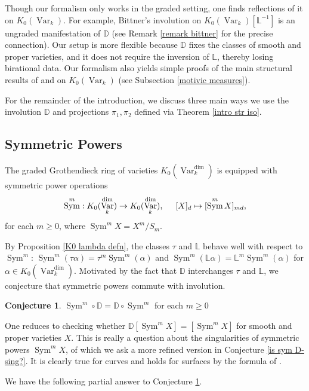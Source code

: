 \documentclass{amsart}
\theoremstyle{definition}
\newtheorem{conj}[thm]{Conjecture}
\DeclareMathOperator{\Sym}{Sym}
\DeclareMathOperator{\Var}{Var}
\newcommand{\Kdim}{K_0(\Var_k^{\dim})}
\numberwithin{equation}{section}
\begin{document}
Though our formalism only works in the graded setting, one finds reflections of it on $K_0(\Var_k)$. For example, Bittner's involution \cite{bittnerrelations} on $K_0(\Var_k)[\mathbb{L}^{-1}]$ is an ungraded manifestation of $\mathbb{D}$ (see Remark \ref{remark bittner} for the precise connection). Our setup is more flexible because $\mathbb{D}$ fixes the classes of smooth and proper varieties, and it does not require the inversion of $\mathbb{L}$, thereby losing birational data. Our formalism also yields simple proofs of the main structural results of \cite{larsenluntsstable} and \cite{zakharevich} on $K_0(\Var_k)$ (see Subsection \ref{motivic measures}).

For the remainder of the introduction, we discuss three main ways we use the involution $\mathbb{D}$ and projections $\pi_1, \pi_2$ defined via Theorem \ref{intro str iso}.


\subsection{Symmetric Powers}
The graded Grothendieck ring of varieties $\Kdim$ is equipped with symmetric power operations
\begin{align*}
    \Sym^m: \Kdim \rightarrow \Kdim, \hspace{.5cm} [X]_d \mapsto [\Sym^m X]_{md},
\end{align*}
for each $m \geq 0$, where $\Sym^m X = X^m / S_m$.

By Proposition \ref{K0 lambda defn}, the classes $\tau$ and $\mathbb{L}$ behave well with respect to $\Sym^m$: $\Sym^m(\tau \alpha) = \tau^m \Sym^m(\alpha)$ and $\Sym^m(\mathbb{L} \alpha) = \mathbb{L}^m \Sym^m(\alpha)$ for $\alpha \in \Kdim$. Motivated by the fact that $\mathbb{D}$ interchanges $\tau$ and $\mathbb{L}$, we conjecture that symmetric powers commute with involution.

\begin{conj}\label{Sym commute D?}
$\Sym^m \circ \mathbb{D} = \mathbb{D} \circ \Sym^m$ for each $m \geq 0$
\end{conj}

 One reduces to checking whether $\mathbb{D}[\Sym^m X] = [\Sym^m X]$ for smooth and proper varieties $X$. This is really a question about the singularities of symmetric powers $\Sym^m X$, of which we ask a more refined version in Conjecture \ref{is sym D-sing?}. It is clearly true for curves and holds for surfaces by the formula of \cite{gottschehilbert}.

We have the following partial answer to Conjecture \ref{Sym commute D?}.
\end{document}
